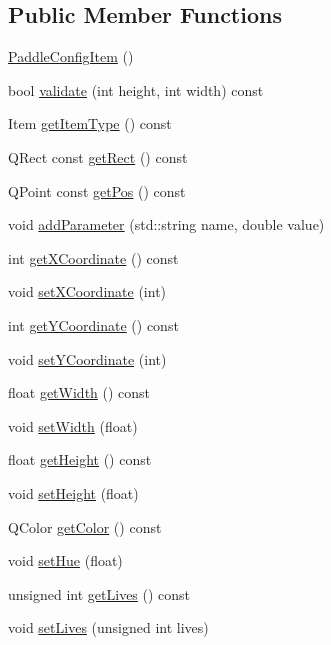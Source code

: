 \subsection*{Public Member Functions}
\begin{DoxyCompactItemize}
\item 
\hyperlink{classPaddleConfigItem_aaf8327c16b6ea75fcc4472635d8d203a}{Paddle\-Config\-Item} ()
\item 
bool \hyperlink{classPaddleConfigItem_a4471662990213dab829792a73683fd0f}{validate} (int height, int width) const 
\item 
Item \hyperlink{classPaddleConfigItem_a9aff3ad1cce28b13cfb1262ce6d73acc}{get\-Item\-Type} () const 
\item 
Q\-Rect const \hyperlink{classPaddleConfigItem_ac4fb268e37165db4eb1367f69cdb7bc7}{get\-Rect} () const 
\item 
Q\-Point const \hyperlink{classPaddleConfigItem_ab089e52a94ef9ec97b2237546254ef54}{get\-Pos} () const 
\item 
void \hyperlink{classPaddleConfigItem_ad7b5b50b1e480e1f0b2b653e05944297}{add\-Parameter} (std\-::string name, double value)
\item 
int \hyperlink{classPaddleConfigItem_a69c5d3519bcaac03472d0a4377c0f45f}{get\-X\-Coordinate} () const 
\item 
void \hyperlink{classPaddleConfigItem_aeef3371c9228bd742a44d01bf54bb99c}{set\-X\-Coordinate} (int)
\item 
int \hyperlink{classPaddleConfigItem_a9750f9729e7a200de27b988407791b16}{get\-Y\-Coordinate} () const 
\item 
void \hyperlink{classPaddleConfigItem_ad6247bbad6123b0f294bbc49c9d82bd3}{set\-Y\-Coordinate} (int)
\item 
float \hyperlink{classPaddleConfigItem_ae91bd3249691e453cb70b5cd105c3254}{get\-Width} () const 
\item 
void \hyperlink{classPaddleConfigItem_a1ed5776eb3a49f8f6f0a7db8cd75d24b}{set\-Width} (float)
\item 
float \hyperlink{classPaddleConfigItem_a543c31554ea6fd4230ce741f7896c655}{get\-Height} () const 
\item 
void \hyperlink{classPaddleConfigItem_a36d85ab3cbe8bf6ad7fa1aa4be04bf67}{set\-Height} (float)
\item 
Q\-Color \hyperlink{classPaddleConfigItem_a3fb77c280dbed567ae5f6dd5e5b875ca}{get\-Color} () const 
\item 
void \hyperlink{classPaddleConfigItem_a2fc99562dc100b5a8a5b2f6aad8ec3a2}{set\-Hue} (float)
\item 
unsigned int \hyperlink{classPaddleConfigItem_a425e6121ec4927ee5c3979a5a8d44c53}{get\-Lives} () const 
\item 
void \hyperlink{classPaddleConfigItem_a20233cf30a4363ce3fcfd65d157ed84a}{set\-Lives} (unsigned int lives)
\end{DoxyCompactItemize}


